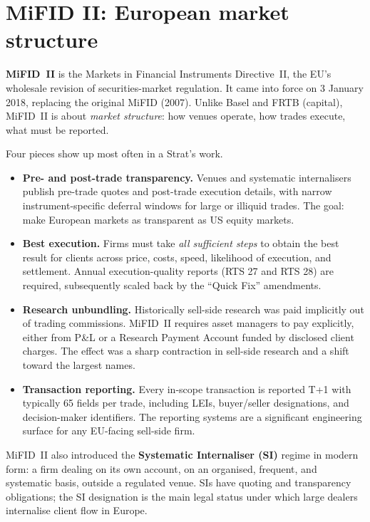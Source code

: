 \section{MiFID II: European market structure}
\label{sec:mifid2}

\textbf{MiFID~II} is the Markets in Financial Instruments
Directive~II, the EU's wholesale revision of securities-market
regulation.  It came into force on 3 January 2018, replacing the
original MiFID (2007).  Unlike Basel and FRTB (capital), MiFID~II
is about \emph{market structure}: how venues operate, how trades
execute, what must be reported.

Four pieces show up most often in a Strat's work.

\begin{itemize}
  \item \textbf{Pre- and post-trade transparency.}  Venues and
    systematic internalisers publish pre-trade quotes and
    post-trade execution details, with narrow
    instrument-specific deferral windows for large or illiquid
    trades.  The goal: make European markets as transparent as
    US equity markets.
  \item \textbf{Best execution.}  Firms must take \emph{all
    sufficient steps} to obtain the best result for clients
    across price, costs, speed, likelihood of execution, and
    settlement.  Annual execution-quality reports (RTS 27 and
    RTS 28) are required, subsequently scaled back by the
    ``Quick Fix'' amendments.
  \item \textbf{Research unbundling.}  Historically sell-side
    research was paid implicitly out of trading commissions.
    MiFID~II requires asset managers to pay explicitly, either
    from P\&L or a Research Payment Account funded by
    disclosed client charges.  The effect was a sharp
    contraction in sell-side research and a shift toward the
    largest names.
  \item \textbf{Transaction reporting.}  Every in-scope
    transaction is reported T+1 with typically 65 fields per
    trade, including LEIs, buyer/seller designations, and
    decision-maker identifiers.  The reporting systems are a
    significant engineering surface for any EU-facing sell-side
    firm.
\end{itemize}

MiFID~II also introduced the \textbf{Systematic Internaliser
(SI)} regime in modern form: a firm dealing on its own account,
on an organised, frequent, and systematic basis, outside a
regulated venue.  SIs have quoting and transparency obligations;
the SI designation is the main legal status under which large
dealers internalise client flow in Europe.

